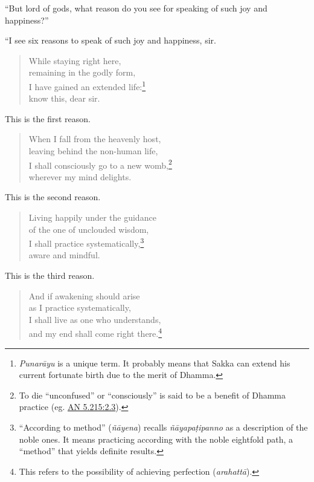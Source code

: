 \documentclass[12pt,openany]{book}%
\begin{document}
“But lord of gods, what reason do you see for speaking of such joy and happiness?” 

“I see six reasons to speak of such joy and happiness, sir. 

\begin{verse}%
While staying right here, \\
remaining in the godly form, \\
I have gained an extended life:\footnote{\textit{\textsanskrit{Punarāyu}} is a unique term. It probably means that Sakka can extend his current fortunate birth due to the merit of Dhamma. } \\
know this, dear sir. 

%
\end{verse}

This is the first reason. 

\begin{verse}%
When I fall from the heavenly host, \\
leaving behind the non-human life, \\
I shall consciously go to a new womb,\footnote{To die “unconfused” or “consciously” is said to be a benefit of Dhamma practice (eg. \href{https://suttacentral.net/an5.215/en/sujato\#2.3}{AN 5.215:2.3}). } \\
wherever my mind delights. 

%
\end{verse}

This is the second reason. 

\begin{verse}%
Living happily under the guidance \\
of the one of unclouded wisdom, \\
I shall practice systematically,\footnote{“According to method” (\textit{\textsanskrit{ñāyena}}) recalls \textit{\textsanskrit{ñāyapaṭipanno}} as a description of the noble ones. It means practicing according with the noble eightfold path, a “method” that yields definite results. } \\
aware and mindful. 

%
\end{verse}

This is the third reason. 

\begin{verse}%
And if awakening should arise \\
as I practice systematically, \\
I shall live as one who understands, \\
and my end shall come right there.\footnote{This refers to the possibility of achieving perfection (\textit{\textsanskrit{arahattā}}). } 

%
\end{verse}
\end{document}
